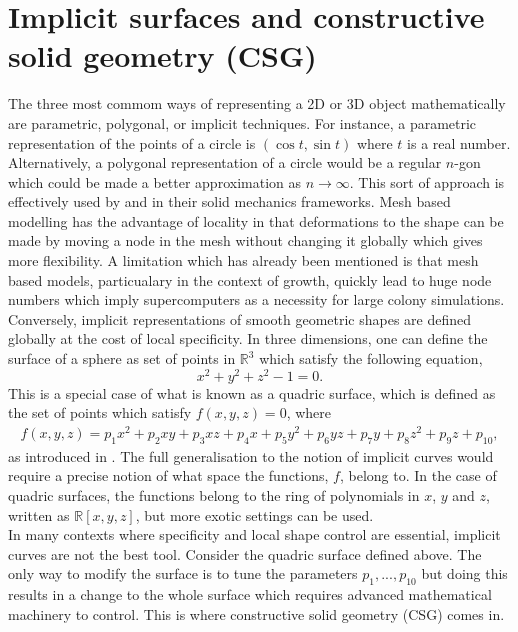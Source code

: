 \section{Implicit surfaces and constructive solid geometry (CSG)}

The three most commom ways 
of representing a 2D or 3D object mathematically are parametric, polygonal,
or implicit techniques. For instance, a parametric representation of the 
points of a circle is $(\cos{t}, \sin{t})$ where $t$
is a real number. Alternatively, a polygonal representation of a circle
would be a regular $n$-gon which could be made a better approximation 
as $n \rightarrow \infty$. This sort of approach is effectively used 
by \cite{van2020quantitative} and \cite{brown2021rigid} in their solid mechanics
frameworks. Mesh based modelling has the advantage of locality in that 
deformations to the shape can be made by moving a node in the mesh
without changing it globally which gives more flexibility.
A limitation which has already been mentioned is that mesh based models, 
particualary in the context of growth, quickly lead to huge node numbers 
which imply supercomputers as a necessity for large colony simulations.
\\

Conversely, implicit representations of smooth geometric shapes are defined 
globally at the cost of local specificity. In three dimensions, one can 
define the surface of a sphere as set of points in $\mathbb{R}^3$ 
which satisfy the following equation,
\begin{equation*}
    x^2 + y^2 + z^2 - 1 = 0.
\end{equation*}
This is a special case of what is known as a quadric surface,
which is defined as the set of points which satisfy $f(x,y,z) =0$, where
\begin{equation*}
\begin{split}
    f(x,y,z) = p_1 x^2 + p_2 xy + p_3 xz + p_4 x + p_5 y^2 + p_6 yz + p_7 y + p_8 z^2 + p_9 z + p_{10},
\end{split}
\end{equation*}
as introduced in \cite{blinn1982generalization}. The full generalisation to the notion 
of implicit curves would require a precise notion of what space 
the functions, $f$, belong to. In the case of quadric surfaces, 
the functions belong to the ring of polynomials in $x$, $y$ and $z$, written as 
$\mathbb{R}[x,y,z]$, but more exotic settings can be used.
\\

In many contexts where specificity and local shape control are essential, 
implicit curves are not the best tool. Consider the quadric surface defined above.
The only way to modify the surface is to tune the parameters $p_1, ..., p_{10}$ but 
doing this results in a change to the whole surface which requires 
advanced mathematical machinery to control. This is where constructive solid geometry (CSG) comes 
in. 
\\

